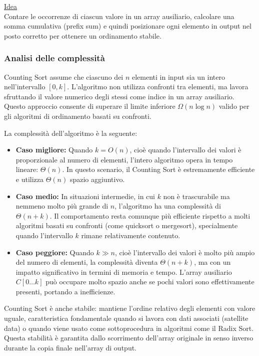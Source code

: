 \documentclass[a4paper, 11pt]{article}
\begin{document}
\noindent  \underline{Idea} \\ Contare le occorrenze di ciascun valore in un array ausiliario, calcolare una somma cumulativa (prefix sum) e quindi posizionare ogni elemento in output nel posto corretto per ottenere un ordinamento stabile.

\subsubsection{Analisi delle complessità}

\noindent Counting Sort assume che ciascuno dei \(n\) elementi in input sia un intero nell’intervallo \([0, k]\). L'algoritmo non utilizza confronti tra elementi, ma lavora sfruttando il valore numerico degli stessi come indice in un array ausiliario. Questo approccio consente di superare il limite inferiore \(\Omega(n \log n)\) valido per gli algoritmi di ordinamento basati su confronti.

\noindent La complessità dell’algoritmo è la seguente:

\begin{itemize}
  \item \textbf{Caso migliore:} Quando \(k = O(n)\), cioè quando l’intervallo dei valori è proporzionale al numero di elementi, l’intero algoritmo opera in tempo lineare: \(\Theta(n)\). In questo scenario, il Counting Sort è estremamente efficiente e utilizza \(\Theta(n)\) spazio aggiuntivo.
  
  \item \textbf{Caso medio:} In situazioni intermedie, in cui \(k\) non è trascurabile ma nemmeno molto più grande di \(n\), l'algoritmo ha una complessità di \(\Theta(n + k)\). Il comportamento resta comunque più efficiente rispetto a molti algoritmi basati su confronti (come quicksort o mergesort), specialmente quando l’intervallo \(k\) rimane relativamente contenuto.

  \item \textbf{Caso peggiore:} Quando \(k \gg n\), cioè l’intervallo dei valori è molto più ampio del numero di elementi, la complessità diventa \(\Theta(n + k)\), ma con un impatto significativo in termini di memoria e tempo. L’array ausiliario \(C[0 \dots k]\) può occupare molto spazio anche se pochi valori sono effettivamente presenti, portando a inefficienze.

\end{itemize}

\noindent Counting Sort è anche stabile: mantiene l’ordine relativo degli elementi con valore uguale, caratteristica fondamentale quando si lavora con dati associati (satellite data) o quando viene usato come sottoprocedura in algoritmi come il Radix Sort. \\
Questa stabilità è garantita dallo scorrimento dell’array originale in senso inverso durante la copia finale nell’array di output.
\end{document}
